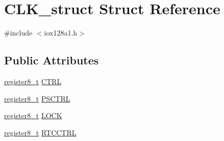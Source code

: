 \hypertarget{struct_c_l_k__struct}{
\section{CLK\_\-struct Struct Reference}
\label{struct_c_l_k__struct}
}


{\ttfamily \#include $<$iox128a1.h$>$}

\subsection*{Public Attributes}
\begin{DoxyCompactItemize}
\item 
\hyperlink{iox128a1_8h_a6a0649252b392263406882923b04a9db}{register8\_\-t} \hyperlink{struct_c_l_k__struct_a1efc0969ed96c40c37d9d5ba95ea76fc}{CTRL}
\item 
\hyperlink{iox128a1_8h_a6a0649252b392263406882923b04a9db}{register8\_\-t} \hyperlink{struct_c_l_k__struct_acda90be4a5b71ecd45629e9a77eda3d2}{PSCTRL}
\item 
\hyperlink{iox128a1_8h_a6a0649252b392263406882923b04a9db}{register8\_\-t} \hyperlink{struct_c_l_k__struct_a23eed8b6b36e9c64e9c87290a1dec8a9}{LOCK}
\item 
\hyperlink{iox128a1_8h_a6a0649252b392263406882923b04a9db}{register8\_\-t} \hyperlink{struct_c_l_k__struct_ae9eb2eed0fea53cd31b84ff2e6ee6808}{RTCCTRL}
\end{DoxyCompactItemize}


